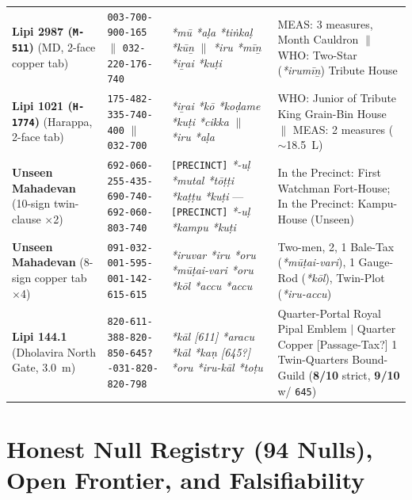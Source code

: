 \documentclass[11pt,a4paper]{article}
\begin{document}
\begin{table}[htbp]
\begin{tabularx}{\textwidth}{@{}L{2.7cm}L{3.2cm}L{4.0cm}Y@{}}
\textbf{Lipi 2987 (\texttt{M-511})} (MD, 2-face copper tab) & \texttt{003-700-900-165} $\parallel$ \texttt{032-220-176-740} & \textit{*mū *aḷa *tiṅkaḷ *kūṉ} $\parallel$ \textit{*iru *mīṉ *iṟai *kuṭi} & MEAS: 3 measures, Month Cauldron $\parallel$ WHO: Two-Star (\textit{*irumīṉ}) Tribute House \\
\textbf{Lipi 1021 (\texttt{H-1774})} (Harappa, 2-face tab) & \texttt{175-482-335-740-400} $\parallel$ \texttt{032-700} & \textit{*iṟai *kō *koḍame *kuṭi *cikka} $\parallel$ \textit{*iru *aḷa} & WHO: Junior of Tribute King Grain-Bin House $\parallel$ MEAS: 2 measures ($\sim$18.5~L) \\
\textbf{Unseen Mahadevan} (10-sign twin-clause $\times$2) & \texttt{692-060-255-435-690-}\allowbreak\texttt{740-692-060-803-740} & \texttt{[PRECINCT]} \textit{*-uḷ *mutal *tōṭṭi *kaṭṭu *kuṭi} --- \texttt{[PRECINCT]} \textit{*-uḷ *kampu *kuṭi} & In the Precinct: First Watchman Fort-House; In the Precinct: Kampu-House (Unseen) \\
\textbf{Unseen Mahadevan} (8-sign copper tab $\times$4) & \texttt{091-032-001-595-}\allowbreak\texttt{001-142-615-615} & \textit{*iruvar *iru *oru *mūṭai-vari *oru *kōl *accu *accu} & Two-men, 2, 1 Bale-Tax (\textit{*mūṭai-vari}), 1 Gauge-Rod (\textit{*kōl}), Twin-Plot (\textit{*iru-accu}) \\
\textbf{Lipi 144.1} (Dholavira North Gate, 3.0~m) & \texttt{820-611-388-820-850-}\allowbreak\texttt{645?-031-820-820-798} & \textit{*kāl [611] *aracu *kāl *kaṇ [645?] *oru *iru-kāl *toṭu} & Quarter-Portal Royal Pipal Emblem $|$ Quarter Copper [Passage-Tax?] 1 Twin-Quarters Bound-Guild (\textbf{8/10} strict, \textbf{9/10} w/ \texttt{645}) \\
\bottomrule
\end{tabularx}
\end{table}

\section{Honest Null Registry (94 Nulls), Open Frontier, and Falsifiability}
\end{document}
